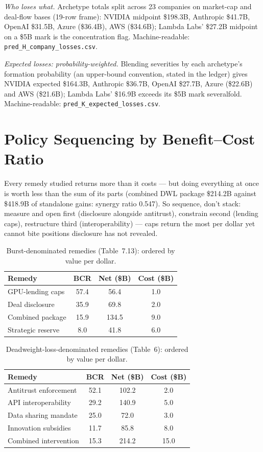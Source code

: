 \documentclass[11pt,a4paper]{article}
\begin{document}
\emph{Who loses what.} Archetype totals split across 23 companies on
market-cap and deal-flow bases (19-row frame): NVIDIA midpoint \$198.3B,
Anthropic \$41.7B, OpenAI \$31.5B, Azure (\$36.4B), AWS (\$34.6B); Lambda
Labs' \$27.2B midpoint on a \$5B mark is the concentration flag.
Machine-readable: \texttt{pred\_H\_company\_losses.csv}.

\emph{Expected losses: probability-weighted.} Blending severities by each
archetype's formation probability (an upper-bound convention, stated in the
ledger) gives NVIDIA expected \$164.3B, Anthropic \$36.7B, OpenAI \$27.7B,
Azure (\$22.6B) and AWS (\$21.6B); Lambda Labs' \$16.9B exceeds its \$5B
mark severalfold. Machine-readable: \texttt{pred\_K\_expected\_losses.csv}.

\section{Policy Sequencing by Benefit--Cost Ratio}\label{sec:policy}
Every remedy studied returns more than it costs --- but doing everything at
once is worth less than the sum of its parts (combined DWL package \$214.2B
against \$418.9B of standalone gains: synergy ratio 0.547). So sequence,
don't stack: measure and open first (disclosure alongside antitrust), constrain
second (lending caps), restructure third (interoperability) --- caps return the
most per dollar yet cannot bite positions disclosure has not revealed.


\begin{table}[htbp]
\centering
\caption{Burst-denominated remedies (Table~7.13): ordered by value per dollar.}
    \label{tab:16a-burstdenominated-remedies-table713}
\begin{tabular}{lccc}
\toprule
Remedy & BCR & Net (\$B) & Cost (\$B) \\
\midrule
GPU-lending caps & 57.4 & 56.4 & 1.0 \\
Deal disclosure & 35.9 & 69.8 & 2.0 \\
Combined package & 15.9 & 134.5 & 9.0 \\
Strategic reserve & 8.0 & 41.8 & 6.0 \\
\bottomrule
\end{tabular}
\end{table}

\begin{table}[htbp]
\centering
\caption{Deadweight-loss-denominated remedies (Table~6): ordered by value per dollar.}
    \label{tab:16b-deadweightlossdenominated-remedies-table}
\begin{tabular}{lccc}
\toprule
Remedy & BCR & Net (\$B) & Cost (\$B) \\
\midrule
Antitrust enforcement & 52.1 & 102.2 & 2.0 \\
API interoperability & 29.2 & 140.9 & 5.0 \\
Data sharing mandate & 25.0 & 72.0 & 3.0 \\
Innovation subsidies & 11.7 & 85.8 & 8.0 \\
\midrule
Combined intervention & 15.3 & 214.2 & 15.0 \\
\bottomrule
\end{tabular}
\end{table}
\end{document}
